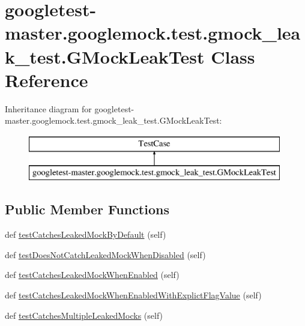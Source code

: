 \hypertarget{classgoogletest-master_1_1googlemock_1_1test_1_1gmock__leak__test_1_1_g_mock_leak_test}{}\section{googletest-\/master.googlemock.\+test.\+gmock\+\_\+leak\+\_\+test.\+G\+Mock\+Leak\+Test Class Reference}
\label{classgoogletest-master_1_1googlemock_1_1test_1_1gmock__leak__test_1_1_g_mock_leak_test}
Inheritance diagram for googletest-\/master.googlemock.\+test.\+gmock\+\_\+leak\+\_\+test.\+G\+Mock\+Leak\+Test\+:\begin{figure}[H]
\begin{center}
\leavevmode
\includegraphics[height=2.000000cm]{db/ddb/classgoogletest-master_1_1googlemock_1_1test_1_1gmock__leak__test_1_1_g_mock_leak_test}
\end{center}
\end{figure}
\subsection*{Public Member Functions}
\begin{DoxyCompactItemize}
\item 
def \mbox{\hyperlink{classgoogletest-master_1_1googlemock_1_1test_1_1gmock__leak__test_1_1_g_mock_leak_test_ad9b8f4866bcbdfee1deb684e88d9f3d0}{test\+Catches\+Leaked\+Mock\+By\+Default}} (self)
\item 
def \mbox{\hyperlink{classgoogletest-master_1_1googlemock_1_1test_1_1gmock__leak__test_1_1_g_mock_leak_test_a717eadcb1b677eb59adb0cc0ee687b84}{test\+Does\+Not\+Catch\+Leaked\+Mock\+When\+Disabled}} (self)
\item 
def \mbox{\hyperlink{classgoogletest-master_1_1googlemock_1_1test_1_1gmock__leak__test_1_1_g_mock_leak_test_aed271a713cec2516055a1b56ddabe8b4}{test\+Catches\+Leaked\+Mock\+When\+Enabled}} (self)
\item 
def \mbox{\hyperlink{classgoogletest-master_1_1googlemock_1_1test_1_1gmock__leak__test_1_1_g_mock_leak_test_a724b3f2c1a38fc9dd77044f35e87823a}{test\+Catches\+Leaked\+Mock\+When\+Enabled\+With\+Explict\+Flag\+Value}} (self)
\item 
def \mbox{\hyperlink{classgoogletest-master_1_1googlemock_1_1test_1_1gmock__leak__test_1_1_g_mock_leak_test_a481934d468ab922fc602be7c2bdc4c64}{test\+Catches\+Multiple\+Leaked\+Mocks}} (self)
\end{DoxyCompactItemize}


